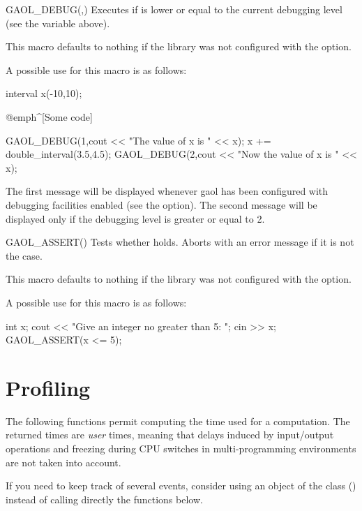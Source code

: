 \documentclass{manual}
\begin{document}
\begin{defmacroA}{GAOL\_DEBUG}{(,)}
  Executes  if  is lower or equal to the current debugging
  level (see the variable  above).

  This macro defaults to nothing if the library was not configured with the
 option.
\end{defmacroA}

\noindent
A possible use for this macro is as follows:

\begin{example}
interval x(-10,10);

@emph^[Some code]~

GAOL_DEBUG(1,cout << "The value of x is " << x);
x += double_interval(3.5,4.5);
GAOL_DEBUG(2,cout << "Now the value of x is " << x);
\end{example}

The first message will be displayed whenever gaol has been configured with
debugging facilities enabled (see the  option). The
second message will be displayed only if the debugging level
is greater or equal to 2.

\begin{defmacro}{GAOL\_ASSERT}{()}
Tests whether  holds. Aborts with an error message if it is not the case.

This macro defaults to nothing if the library was not configured with the
 option.
\end{defmacro}

\noindent
A possible use for this macro is as follows:

\begin{example}
int x;
cout << "Give an integer no greater than 5: ";
cin >> x;
GAOL_ASSERT(x <= 5);
\end{example}

\chapter{Profiling}

The following functions permit computing the time used for a computation. The
returned times are \emph{user} times, meaning that delays induced by
input/output operations and freezing during CPU switches in multi-programming
environments are not taken into account.

If you need to keep track of several events, consider using an object of the
 class () instead of calling
directly the functions below.
\end{document}
